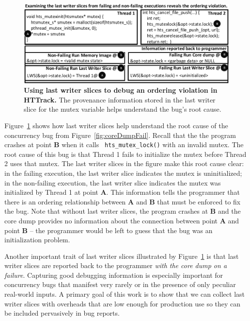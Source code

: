 \documentclass[preprint,9pt]{sigplanconf}
\begin{document}
\begin{figure}[h]
\centering
\includegraphics[width=\columnwidth]{figs/LWSHTTDebug.pdf}
\caption{\label{fig:httlws}{\bf Using last writer slices to debug an
ordering violation in HTTrack.} The provenance information stored in the last
writer slice for the mutex variable helps understand the bug's root cause.}
\end{figure}



Figure~\ref{fig:httlws} shows how last writer slices help understand the root
cause of the concurrency bug from Figure~\ref{fig:coreDumpFail}.  Recall
that the the program crashes at point {\bf B} when it calls {\tt
hts\_mutex\_lock()} with an invalid mutex.    The root cause of this bug is
that Thread 1 fails to initialize the mutex before Thread 2 uses that mutex.
The last writer slices in the figure make this root cause clear: in the
failing execution, the last writer slice indicates the mutex is uninitialized; in
the non-failing execution, the last writer slice indicates the mutex was 
initialized by Thread 1 at point {\bf A}.  This information tells the
programmer that there is an ordering relationship between {\bf A} and {\bf B}
that must be enforced to fix the bug.  Note that without last writer slices,
the program crashes at {\bf B} and the core dump provides no information about
the connection between point {\bf A} and point {\bf B} -- the programmer would be left to guess that the bug was an initialization problem.

Another important trait of last writer slices illustrated by
Figure~\ref{fig:httlws} is that last writer slices are reported back to the
programmer {\em with the core dump on a failure}.  Capturing good debugging
information is especially important for concurrency bugs that manifest very
rarely or in the presence of only peculiar real-world inputs.  A primary goal
of this work is to show that we can collect last writer slices with overheads
that are low enough for production use so they can be included pervasively in
bug reports.
\end{document}
